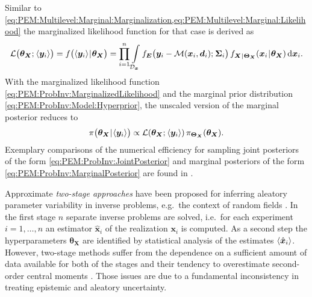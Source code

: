 Similar to \cref{eq:PEM:Multilevel:Marginal:Marginalization,eq:PEM:Multilevel:Marginal:Likelihood} the marginalized likelihood function for that case is derived as
\begin{equation} \label{eq:PEM:ProbInv:MarginalizedLikelihood}
  \mathcal{L} \big( \bm{\theta}_{\bm{X}} \distparam \tuple{\bm{y}_i} \big)
  = f \big( \tuple{\bm{y}_i} \cond \bm{\theta}_{\bm{X}} \big)
  = \prod\limits_{i=1}^n \int\limits_{\mathcal{D}_{\bm{x}}} f_{\bm{E}} \big( \bm{y}_i-\mathcal{M}(\bm{x}_i,\bm{d}_i) \distparam \bm{\Sigma}_i \big)
  \, f_{\bm{X} \cond \bm{\Theta}_{\bm{X}}} (\bm{x}_i \cond \bm{\theta}_{\bm{X}}) \, \mathrm{d} \bm{x}_i.
\end{equation}
With the marginalized likelihood function \cref{eq:PEM:ProbInv:MarginalizedLikelihood} and the marginal prior distribution \cref{eq:PEM:ProbInv:Model:Hyperprior},
the unscaled version of the marginal posterior reduces to
\begin{equation} \label{eq:PEM:ProbInv:MarginalPosterior}
  \pi \big( \bm{\theta}_{\bm{X}} {\:\!}|{\:\!} \langle{\bm{y}_i}\rangle \big) \propto \mathcal{L} (\bm{\theta}_{\bm{X}} ;{\:\!} \langle{\bm{y}_i}\rangle) \, \pi_{\bm{\Theta}_{\bm{X}}} (\bm{\theta}_{\bm{X}}).
\end{equation}
Exemplary comparisons of the numerical efficiency for sampling joint posteriors of the form \cref{eq:PEM:ProbInv:JointPosterior}
and marginal posteriors of the form \cref{eq:PEM:ProbInv:MarginalPosterior} are found in \cite{Nagel:IPW2013:Proc,Multilevel:Ballesteros2014:Proc}.
\par %
Approximate \textit{two-stage approaches} have been proposed for inferring aleatory parameter variability in inverse problems,
e.g.\ the context of random fields \cite{PCE:Desceliers2006,PCE:Desceliers2007,Multilevel:Mehrez2012:II,Multilevel:Debruyne2015}.
In the first stage \(n\) separate inverse problems are solved, i.e.\ for each experiment \(i = 1,\ldots,n\) an estimator \(\hat{\bm{x}}_i\) of the realization \(\bm{x}_i\) is computed.
As a second step the hyperparameters \(\bm{\theta}_{\bm{X}}\) are identified by statistical analysis of the estimates \(\langle{\hat{\bm{x}}_i}\rangle\).
However, two-stage methods suffer from the dependence on a sufficient amount of data available for both of the stages
and their tendency to overestimate second-order central moments \cite{Multilevel:Davidian2003,Multilevel:Banks2012}.
Those issues are due to a fundamental inconsistency in treating epistemic and aleatory uncertainty.
